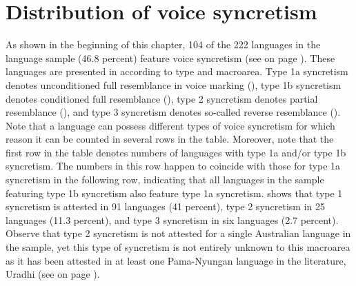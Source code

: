 \section{Distribution of voice syncretism} \label{dist:syncretism}
As shown in the beginning of this chapter, 104 of the 222 languages in the language sample (46.8 percent) feature voice syncretism (see  on page \pageref{tab:ch6:voice-syncretism}). These languages are presented in  according to type and macroarea. Type 1a syncretism denotes unconditioned full resemblance in voice marking (), type 1b syncretism denotes conditioned full resemblance (), type 2 syncretism denotes partial resemblance (), and type 3 syncretism denotes so-called reverse resemblance (). Note that a language can possess different types of voice syncretism for which reason it can be counted in several rows in the table. Moreover, note that the first row in the table denotes numbers of languages with type 1a and/or type 1b syncretism. The numbers in this row happen to coincide with those for type 1a syncretism in the following row, indicating that all languages in the sample featuring type 1b syncretism also feature type 1a syncretism.  shows that type 1 syncretism is attested in 91 languages (41 percent), type 2 syncretism in 25 languages (11.3 percent), and type 3 syncretism in six languages (2.7 percent). Observe that type 2 syncretism is not attested for a single Australian language in the sample, yet this type of syncretism is not entirely unknown to this macroarea as it has been attested in at least one Pama-Nyungan language in the literature, Uradhi (see  on page \pageref{tab:ch1:nedjalkov-examples}).

